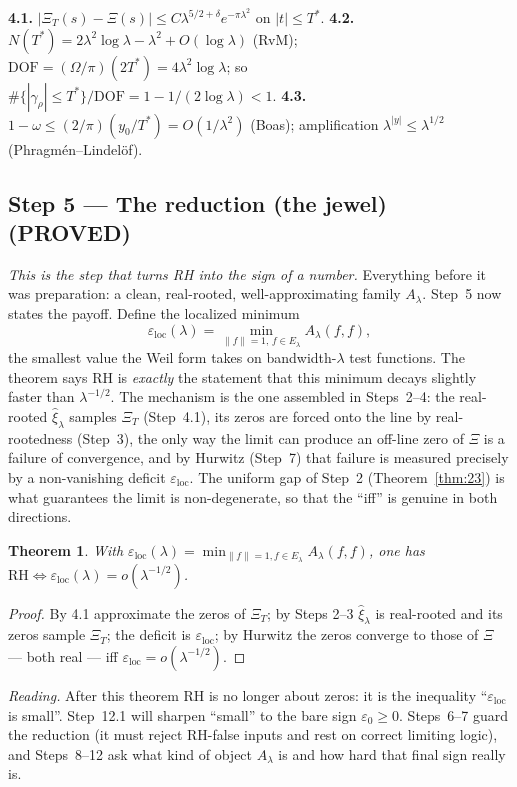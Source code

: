 \documentclass[11pt]{amsart}
\newtheorem{theorem}{Theorem}[section]
\theoremstyle{definition}
\theoremstyle{remark}
\newcommand{\ve}{\varepsilon}
\newcommand{\loc}{\mathrm{loc}}
\newcommand{\PROVED}{\textbf{(PROVED)}}
\begin{document}
\textbf{4.1.} $|\Xi_T(s)-\Xi(s)|\le C\lambda^{5/2+\delta}e^{-\pi\lambda^2}$ on $|t|\le T^*$.\quad
\textbf{4.2.} $N(T^*)=2\lambda^2\log\lambda-\lambda^2+O(\log\lambda)$ (RvM);
$\mathrm{DOF}=(\Omega/\pi)(2T^*)=4\lambda^2\log\lambda$; so
$\#\{|\gamma_\rho|\le T^*\}/\mathrm{DOF}=1-1/(2\log\lambda)<1$.\quad
\textbf{4.3.} $1-\omega\le(2/\pi)(y_0/T^*)=O(1/\lambda^2)$ (Boas); amplification
$\lambda^{|y|}\le\lambda^{1/2}$ (Phragm\'en--Lindel\"of).

\subsection{Step 5 --- The reduction (the jewel) \PROVED}

\emph{This is the step that turns RH into the sign of a number.} Everything before it was
preparation: a clean, real-rooted, well-approximating family $A_\lambda$. Step~5 now states the
payoff. Define the localized minimum
\[
\ve_\loc(\lambda)=\min_{\|f\|=1,\,f\in E_\lambda}A_\lambda(f,f) ,
\]
the smallest value the Weil form takes on bandwidth-$\lambda$ test functions. The theorem says
RH is \emph{exactly} the statement that this minimum decays slightly faster than $\lambda^{-1/2}$.
The mechanism is the one assembled in Steps~2--4: the real-rooted $\hat\xi_\lambda$ samples
$\Xi_T$ (Step~4.1), its zeros are forced onto the line by real-rootedness (Step~3), the only way
the limit can produce an off-line zero of $\Xi$ is a failure of convergence, and by Hurwitz
(Step~7) that failure is measured precisely by a non-vanishing deficit $\ve_\loc$. The uniform
gap of Step~2 (Theorem~\ref{thm:23}) is what guarantees the limit is non-degenerate, so that the
``iff'' is genuine in both directions.

\begin{theorem}
With $\ve_\loc(\lambda)=\min_{\|f\|=1,f\in E_\lambda}A_\lambda(f,f)$, one has
$\mathrm{RH}\iff\ve_\loc(\lambda)=o(\lambda^{-1/2})$.
\end{theorem}
\begin{proof}
By 4.1 approximate the zeros of $\Xi_T$; by Steps 2--3 $\hat\xi_\lambda$ is real-rooted and its
zeros sample $\Xi_T$; the deficit is $\ve_\loc$; by Hurwitz the zeros converge to those of $\Xi$
--- both real --- iff $\ve_\loc=o(\lambda^{-1/2})$.
\end{proof}

\noindent\emph{Reading.} After this theorem RH is no longer about zeros: it is the inequality
``$\ve_\loc$ is small''. Step~12.1 will sharpen ``small'' to the bare sign $\ve_0\ge0$. Steps~6--7
guard the reduction (it must reject RH-false inputs and rest on correct limiting logic), and
Steps~8--12 ask what kind of object $A_\lambda$ is and how hard that final sign really is.
\end{document}
